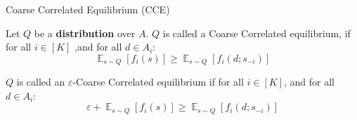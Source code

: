 \documentclass[aspectratio=169,xcolor=dvipsnames,t]{beamer}
\DeclareMathOperator*{\expectation}{\mathbb{E}}
\begin{document}

\begin{frame}{Coarse Correlated Equilibrium (CCE)}
    \begin{definition}
        Let $Q$ be a \textbf{distribution} over $A$. $Q$ is called a Coarse Correlated equilibrium, if for all $i\in [K]$ ,and for all $d\in A_i$:
        \begin{equation*}
            \expectation_{s\sim Q}[f_i(s)] \geq \expectation_{s\sim Q}[f_i(d;s_{-i})]
        \end{equation*}
    \end{definition}
    \begin{Definition}
    $Q$ is called an $\varepsilon$-Coarse Correlated equilibrium if for all $i\in [K]$, and for all $d\in A_i$:
    \begin{equation*}
        \varepsilon + \expectation_{s\sim Q}[f_i(s)] \geq \expectation_{s\sim Q}[f_i(d;s_{-i})]
    \end{equation*}
    \end{Definition}
\end{frame}

\end{document}
